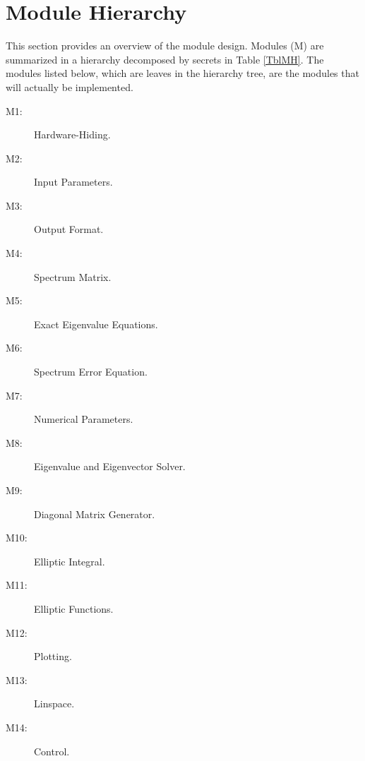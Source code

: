 \documentclass[12pt, titlepage]{article}
\begin{document}
\section{Module Hierarchy} \label{SecMH}

This section provides an overview of the module design. Modules (M) are 
summarized
in a hierarchy decomposed by secrets in Table \ref{TblMH}. The modules listed
below, which are leaves in the hierarchy tree, are the modules that will
actually be implemented.
\begin{description}
\item[M1:] Hardware-Hiding.\\
\item[M2:] Input Parameters.\\
\item[M3:] Output Format.\\
\item[M4:] Spectrum Matrix.\\
\item[M5:] Exact Eigenvalue Equations.\\ 
\item[M6:] Spectrum Error Equation.\\
\item[M7:] Numerical Parameters. \\
\item[M8:] Eigenvalue and Eigenvector Solver. \\
\item[M9:] Diagonal Matrix Generator.\\ 
\item[M10:] Elliptic Integral. \\
\item[M11:] Elliptic Functions. \\
\item[M12:] Plotting. \\ 
\item[M13:] Linspace. \\ 
\item[M14:] Control. \\
\end{description}
\end{document}

